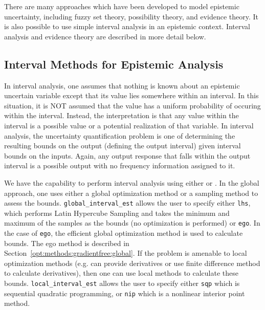 There are many approaches which have been developed to model epistemic
uncertainty, including fuzzy set theory, possibility theory, and
evidence theory. It is also possible to use simple interval analysis in 
an epistemic context. Interval analysis and evidence theory are 
described in more detail below.

\subsection{Interval Methods for Epistemic Analysis}\label{uq:interval}

In interval analysis, one assumes that nothing is known about 
an epistemic uncertain variable except that its value lies 
somewhere within an interval. In this situation, it is NOT 
assumed that the value has a uniform probability of occuring 
within the interval. Instead, the interpretation is that 
any value within the interval is a possible value or a potential 
realization of that variable. In interval analysis, the 
uncertainty quantification problem is one of determining the 
resulting bounds on the output (defining the output interval) 
given interval bounds on the inputs. Again, any output response 
that falls within the output interval is a possible output 
with no frequency information assigned to it.

We have the capability to perform interval analysis using either
 or .  In
the global approach, one uses either a global optimization method or a
sampling method to assess the bounds.  \texttt{global\_interval\_est}
allows the user to specify either \texttt{lhs}, which performs Latin
Hypercube Sampling and takes the minimum and maximum of the samples as
the bounds (no optimization is performed) or \texttt{ego}. In the case
of \texttt{ego}, the efficient global optimization method is used to
calculate bounds. The ego method is described in
Section~\ref{opt:methods:gradientfree:global}.  If the problem is
amenable to local optimization methods (e.g. can provide derivatives
or use finite difference method to calculate derivatives), then one
can use local methods to calculate these
bounds. \texttt{local\_interval\_est} allows the user to specify
either \texttt{sqp} which is sequential quadratic programming, or
\texttt{nip} which is a nonlinear interior point method.

